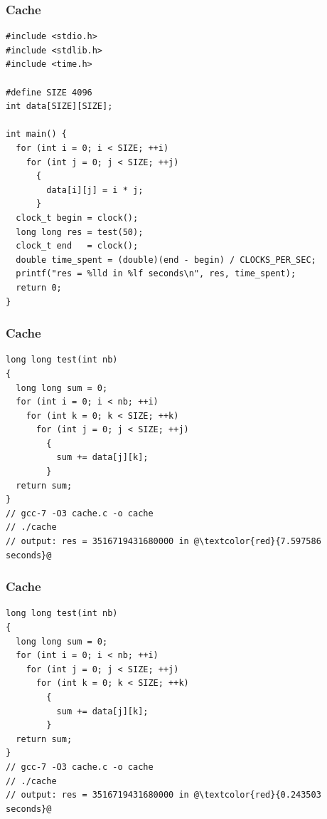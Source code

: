 \documentclass{beamer}
\begin{document}
\begin{frame}[fragile]
\frametitle{Cache}
\scriptsize
\begin{lstlisting}[linebackgroundcolor={\lstcolorlines{6,12,15}}]
#include <stdio.h>
#include <stdlib.h>
#include <time.h>

#define SIZE 4096
int data[SIZE][SIZE];

int main() {
  for (int i = 0; i < SIZE; ++i)
    for (int j = 0; j < SIZE; ++j)
      {
        data[i][j] = i * j;
      }
  clock_t begin = clock();
  long long res = test(50);
  clock_t end   = clock();
  double time_spent = (double)(end - begin) / CLOCKS_PER_SEC;
  printf("res = %lld in %lf seconds\n", res, time_spent);
  return 0;
}
\end{lstlisting}

\end{frame}

\begin{frame}[fragile]
\frametitle{Cache}
\scriptsize

\begin{lstlisting}[linebackgroundcolor={\lstcolorlines{5,6,8}}]
long long test(int nb)
{
  long long sum = 0;
  for (int i = 0; i < nb; ++i)
    for (int k = 0; k < SIZE; ++k)
      for (int j = 0; j < SIZE; ++j)
        {
          sum += data[j][k];
        }
  return sum;
}
// gcc-7 -O3 cache.c -o cache
// ./cache
// output: res = 3516719431680000 in @\textcolor{red}{7.597586 seconds}@
\end{lstlisting}

\end{frame}

\begin{frame}[fragile]
\frametitle{Cache}
\scriptsize

\begin{lstlisting}[linebackgroundcolor={\lstcolorlines{5,6,8}}]
long long test(int nb)
{
  long long sum = 0;
  for (int i = 0; i < nb; ++i)
    for (int j = 0; j < SIZE; ++j)
      for (int k = 0; k < SIZE; ++k)
        {
          sum += data[j][k];
        }
  return sum;
}
// gcc-7 -O3 cache.c -o cache
// ./cache
// output: res = 3516719431680000 in @\textcolor{red}{0.243503 seconds}@
\end{lstlisting}

\end{frame}
\end{document}
